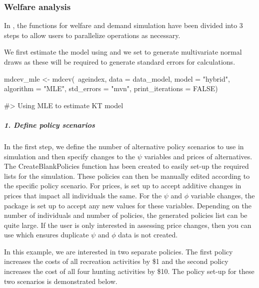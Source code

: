 \hypertarget{welfare-analysis}{%
\subsubsection{Welfare analysis}\label{welfare-analysis}}

In , the functions for welfare and demand simulation have
been divided into 3 steps to allow users to parallelize operations as
necessary.

We first estimate the model using  and we set
 to generate multivariate normal draws as
these will be required to generate standard errors for calculations.

\begin{example}
mdcev_mle <- mdcev(~ageindex,
                  data = data_model,
                  model = "hybrid",
                  algorithm = "MLE",
                  std_errors = "mvn",
                  print_iterations = FALSE)

#> Using MLE to estimate KT model
\end{example}

\hypertarget{define-policy-scenarios}{%
\subparagraph{1. Define policy
scenarios}\label{define-policy-scenarios}}

In the first step, we define the number of alternative policy scenarios
to use in simulation and then specify changes to the \(\psi\) variables
and prices of alternatives. The CreateBlankPolicies function has been
created to easily set-up the required lists for the simulation. These
policies can then be manually edited according to the specific policy
scenario. For prices,  is set up to accept additive changes
in prices that impact all individuals the same. For the \(\psi\) and
\(\phi\) variable changes, the package is set up to accept any new
values for these variables. Depending on the number of individuals and
number of policies, the generated policies list can be quite large. If
the user is only interested in assessing price changes, then you can use
 which ensures duplicate \(\psi\) and
\(\phi\) data is not created.

In this example, we are interested in two separate policies. The first
policy increases the costs of all recreation activities by \$1 and the
second policy increases the cost of all four hunting activities by \$10.
The policy set-up for these two scenarios is demonstrated below.


